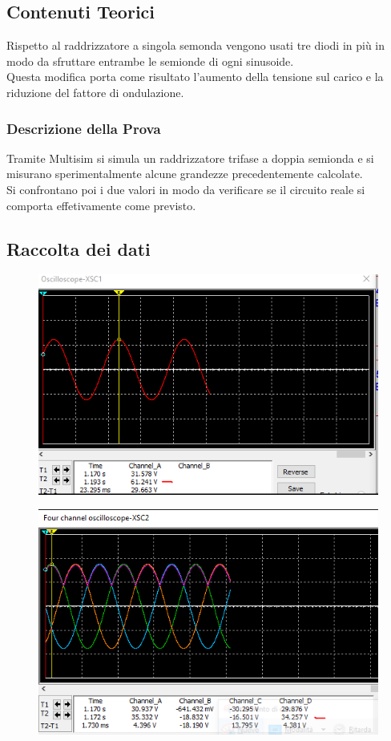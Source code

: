 \documentclass[12pt]{article}
\begin{document}
\subsection{Contenuti Teorici}
Rispetto al raddrizzatore a singola semonda vengono usati tre diodi in più in modo da sfruttare entrambe
le semionde di ogni sinusoide.\\
Questa modifica porta come risultato l'aumento della tensione sul carico e la riduzione del fattore di ondulazione.\\
\subsubsection{Descrizione della Prova}
Tramite Multisim si simula un raddrizzatore trifase a doppia semionda e si misurano sperimentalmente
alcune grandezze precedentemente calcolate.\\ Si confrontano poi i due valori in modo da verificare se il circuito
reale si comporta effetivamente come previsto.

\subsection{Raccolta dei dati}
\begin{figure}[!ht]
    \centering
    \includegraphics[scale=0.4]{oscdopp1.PNG}
\end{figure}

\begin{figure}[!ht]
    \centering
    \includegraphics[scale=0.5]{oscdopp2.PNG}
\end{figure}
\end{document}
